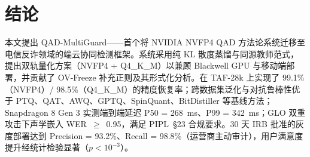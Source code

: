 \documentclass[UTF8,a4paper,10pt,twocolumn]{ctexart}
\theoremstyle{plain}
\newcommand{\QAD}{QAD-MultiGuard}
\begin{document}
\section{结论}

本文提出 \QAD{}——首个将 NVIDIA NVFP4 QAD 方法论系统迁移至电信反诈领域的端云协同检测框架。系统采用纯 KL 散度蒸馏与同源教师范式，提出双轨量化方案（NVFP4 + Q4\_K\_M）以兼顾 Blackwell GPU 与移动端部署，并贡献了 OV-Freeze 补充正则及其形式化分析。在 TAF-28k 上实现了 99.1\%（NVFP4）/ 98.5\%（Q4\_K\_M）的精度恢复率；跨数据集泛化与对抗鲁棒性优于 PTQ、QAT、AWQ、GPTQ、SpinQuant、BitDistiller 等基线方法；Snapdragon 8 Gen 3 实测端到端延迟 P50 = 268~ms、P99 = 342~ms；GLO 双重攻击下声学嵌入 WER~$\geq$~0.95，满足 PIPL~\S23 合规要求。30 天 IRB 批准的灰度部署达到 Precision = 93.2\%、Recall = 98.8\%（运营商主动审计），用户满意度提升经统计检验显著（$p < 10^{-3}$）。
\end{document}
